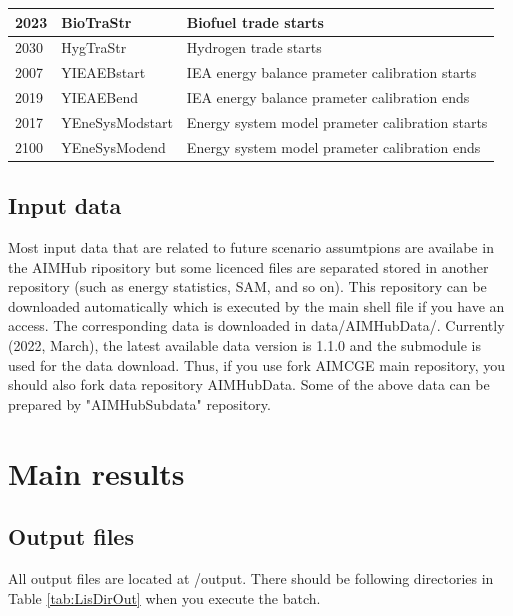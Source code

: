 \documentclass[10pt,a4paper,titlepage,dvipdfmx]{book}
\begin{document}
\begin{tabularx}{\textwidth}{|
p{}|
p{}|
p{}|}
2023 & BioTraStr & Biofuel trade starts \\\hline 
2030 & HygTraStr & Hydrogen trade starts \\\hline 
2007 & YIEAEBstart & IEA energy balance prameter calibration starts \\\hline 
2019 & YIEAEBend & IEA energy balance prameter calibration ends \\\hline 
2017 & YEneSysModstart & Energy system model prameter calibration starts \\\hline 
2100 & YEneSysModend & Energy system model prameter calibration ends \\\hline 
\end{tabularx}

\section{\label{sec:InpData}Input data}
Most input data that are related to future scenario assumtpions are availabe in the AIMHub ripository but some licenced files are separated stored in another repository (such as energy statistics, SAM, and so on).
This repository can be downloaded automatically which is executed by the main shell file if you have an access.
The corresponding data is downloaded in data/AIMHubData/. Currently (2022, March), the latest available data version is 1.1.0 and the submodule is used for the data download. Thus, if you use fork AIMCGE main repository, you should also fork data repository AIMHubData.
Some of the above data can be prepared by "AIMHubSubdata" repository.


\chapter{\label{chp:MainRes}Main results}

\section{\label{sec:OutFile}Output files}

    All output files are located at /output. There should be following directories in Table \ref{tab:LisDirOut} when you execute the batch.
\end{document}
